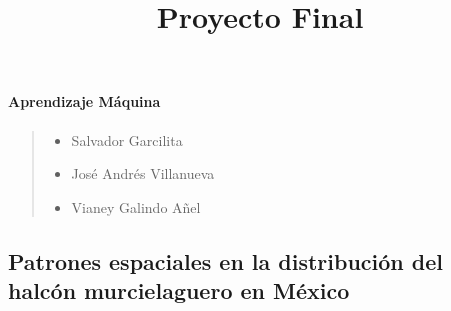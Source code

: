 \documentclass[
]{article}
\title{Proyecto Final}
\author{}
\date{\vspace{-2.5em}}
\providecommand{\tightlist}{%
  \setlength{\itemsep}{0pt}\setlength{\parskip}{0pt}}
\begin{document}
\maketitle

\hypertarget{aprendizaje-muxe1quina}{%
\paragraph{Aprendizaje Máquina}\label{aprendizaje-muxe1quina}}

\begin{quote}
\begin{itemize}
\tightlist
\item
  Salvador Garcilita
\item
  José Andrés Villanueva
\item
  Vianey Galindo Añel
\end{itemize}
\end{quote}

\hypertarget{patrones-espaciales-en-la-distribuciuxf3n-del-halcuxf3n-murcielaguero-en-muxe9xico}{%
\subsection{Patrones espaciales en la distribución del halcón
murcielaguero en
México}\label{patrones-espaciales-en-la-distribuciuxf3n-del-halcuxf3n-murcielaguero-en-muxe9xico}}
\end{document}
